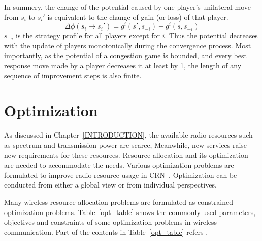 In summery, the change of the potential caused by one player's unilateral move from $s_i$ to $s_i'$ is equivalent to the change of gain (or loss) of that player.
\begin{equation}
\label{5}
\varDelta \phi(s_i \rightarrow s_i') = g^i(s',s_{-i}) - g^i(s,s_{-i})
\end{equation}
$s_{-i}$ is the strategy profile for all players except for $i$.
Thus the potential decreases with the update of players monotonically during the convergence process.
Most importantly, as the potential of a congestion game is bounded, and every best response move made by a player decreases it at least by 1, the length of any sequence of improvement steps is also finite.







\section{Optimization}
As discussed in Chapter~\ref{INTRODUCTION}, the available radio resources such as spectrum and transmission power are scarce, Meanwhile, new services raise new requirements for these resources.
Resource allocation and its optimization are needed to accommodate the needs.
Various optimization problems are formulated to improve radio resource usage in CRN~\cite{cacao_ca_2011, fuzzy_decision_09, resourceAllocation_imperfectSensing_2012}.
Optimization can be conducted from either a global view or from individual perspectives.

Many wireless resource allocation problems are formulated as constrained optimization problems.
Table~\ref{opt_table} shows the commonly used parameters, objectives and constraints of some optimization problems in wireless communication.
Part of the contents in Table~\ref{opt_table} refers \cite{Han:2008:RAW:1457343}.

